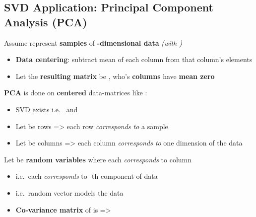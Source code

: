 \subsection*{SVD Application: Principal Component Analysis (PCA)}

Assume 
represent \textbf{ samples} of \textbf{-dimensional
      data} \emph{(with )}

\begin{itemize}

      \item
            \textbf{Data centering}: subtract mean of each column from that
            column's elements
      \item
            Let the \textbf{resulting matrix} be
            , who's \textbf{columns} have
            \textbf{mean zero}
\end{itemize}

\textbf{PCA} is done on \textbf{centered} data-matrices like
:

\begin{itemize}

      \item
            SVD exists i.e.~ and 
      \item
            Let  be rows
            =\textgreater{} each row \emph{corresponds to} a sample
      \item
            Let  be columns
            =\textgreater{} each column \emph{corresponds to} one dimension of
            the data
\end{itemize}

Let  be \textbf{random variables} where
each  \emph{corresponds} to column 

\begin{itemize}

      \item
            i.e.~each  \emph{corresponds} to -th component
            of data
      \item
            i.e.~random vector  models the
            data 
      \item
            \textbf{Co-variance matrix} of  is
             =\textgreater{}
\end{itemize}

